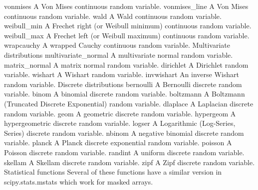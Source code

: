 vonmises	A Von Mises continuous random variable.
vonmises_line	A Von Mises continuous random variable.
wald	A Wald continuous random variable.
weibull_min	A Frechet right (or Weibull minimum) continuous random variable.
weibull_max	A Frechet left (or Weibull maximum) continuous random variable.
wrapcauchy	A wrapped Cauchy continuous random variable.
Multivariate distributions
multivariate_normal	A multivariate normal random variable.
matrix_normal	A matrix normal random variable.
dirichlet	A Dirichlet random variable.
wishart	A Wishart random variable.
invwishart	An inverse Wishart random variable.
Discrete distributions
bernoulli	A Bernoulli discrete random variable.
binom	A binomial discrete random variable.
boltzmann	A Boltzmann (Truncated Discrete Exponential) random variable.
dlaplace	A Laplacian discrete random variable.
geom	A geometric discrete random variable.
hypergeom	A hypergeometric discrete random variable.
logser	A Logarithmic (Log-Series, Series) discrete random variable.
nbinom	A negative binomial discrete random variable.
planck	A Planck discrete exponential random variable.
poisson	A Poisson discrete random variable.
randint	A uniform discrete random variable.
skellam	A Skellam discrete random variable.
zipf	A Zipf discrete random variable.
Statistical functions
Several of these functions have a similar version in scipy.stats.mstats which work for masked arrays.

